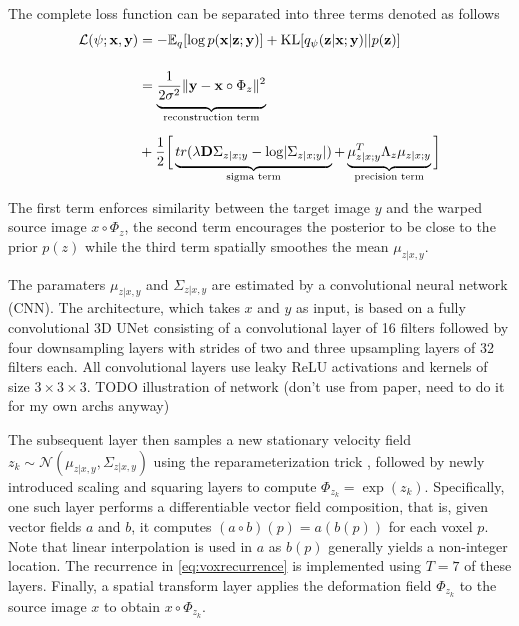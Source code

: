 The complete loss function can be separated into three terms denoted as follows
\begin{equation} \label{eq:voxloss}
	\begin{split}
		\mathcal{L}(\psi; \mathbf{x}, \mathbf{y})
		& = -\E_{q}[ \log p( \mathbf{x} | \mathbf{z}; \mathbf{y} ) ]
		+ \text{KL} [ q_{\psi} ( \mathbf{z} | \mathbf{x} ; \mathbf{y} ) || p ( \mathbf{z} ) ] \\[12pt]
		& = \underbrace{
			\frac{1}{2 \sigma^2} \norm{\mathbf{y} - \mathbf{x} \circ \Phi_{z}}^{2} \vphantom{\frac{1}{2_{2_2}}}
		}_{\text{reconstruction term}} \\[6pt]
		& + \frac{1}{2} \bigg[
		\underbrace{
			tr( \lambda \mathbf{D} \Sigma_{z | x; y} - \log \abs{ \Sigma_{z | x; y} } ) \vphantom{\mu_{z | x; y}^{T}}
		}_{\text{sigma term}} +
		\underbrace{
			\mu_{z | x; y}^{T} \Lambda_{z} \mu_{z | x; y}
		}_{\text{precision term}} \bigg]
	\end{split}
\end{equation}

The first term enforces similarity between the target image $y$ and the warped source image $x \circ \Phi_z$, the second term encourages the posterior to be close to the prior $p(z)$ while the third term spatially smoothes the mean $\mu_{z | x, y}$.

The paramaters $\mu_{z | x, y}$ and $\Sigma_{z | x, y}$ are estimated by a convolutional neural network (CNN). The architecture, which takes $x$ and $y$ as input, is based on a fully convolutional 3D UNet consisting of a convolutional layer of 16 filters followed by four downsampling layers with strides of two and three upsampling layers of 32 filters each. All convolutional layers use leaky ReLU activations and kernels of size $3\times3\times3$. TODO illustration of network (don't use from paper, need to do it for my own archs anyway)

The subsequent layer then samples a new stationary velocity field $z_k \sim \mathcal{N}(\mu_{z | x, y}, \Sigma_{z | x, y})$ using the reparameterization trick \cite{kingma2013}, followed by newly introduced scaling and squaring layers to compute $\Phi_{z_k} = \exp(z_k)$. Specifically, one such layer performs a differentiable vector field composition, that is, given vector fields $a$ and $b$, it computes $(a \circ b)(p) = a(b(p))$ for each voxel $p$. Note that linear interpolation is used in $a$ as $b(p)$ generally yields a non-integer location. The recurrence in \autoref{eq:voxrecurrence} is implemented using $T = 7$ of these layers. Finally, a spatial transform layer applies the deformation field $\Phi_{z_k}$ to the source image $x$ to obtain $x \circ \Phi_{z_k}$.

